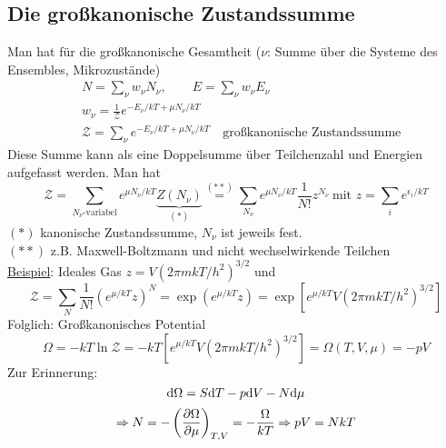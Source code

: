 \subsection{Die großkanonische Zustandssumme}
Man hat für die großkanonische Gesamtheit ($\nu$: Summe über die Systeme des Ensembles, Mikrozustände)
\begin{equation}
    \begin{split}
        & N = \sum_\nu w_\nu N_\nu, \qquad E = \sum_\nu w_\nu E_\nu \\
        & w_\nu = \frac{1}{\mathcal{Z}} e^{- E_\nu / kT + \mu N_\nu / kT} \\
        & \mathcal{Z} = \sum_\nu e^{-E_\nu / k T + \mu N_\nu / kT} \quad \text{großkanonische Zustandssumme}
    \end{split}
\end{equation}
Diese Summe kann als eine Doppelsumme über Teilchenzahl und Energien aufgefasst werden. Man hat
\begin{equation}
    \mathcal{Z} = \sum_{N_\nu \text{-variabel}} e^{\mu N_\nu / k T} \underbrace{Z(N_\nu)}_{(*)} \overset{(**)}{=} \sum_{N_\nu} e^{\mu N_\nu / kT} \frac{1}{N!} z^{N_\nu} \ \text{mit } z = \sum_i e^{\epsilon_i / kT}
\end{equation}
$(*)$ kanonische Zustandssumme, $N_\nu$ ist jeweils fest. \\
$(**)$ z.B. Maxwell-Boltzmann und nicht wechselwirkende Teilchen\\
\underline{Beispiel}: Ideales Gas $z = V (2 \pi m k T / h^2)^{3/2}$ und
\begin{equation}
    \label{eq:grosskan_summe:idealesGas}
    \mathcal{Z} = \sum_N \frac{1}{N!} \left( e^{\mu / kT} z \right)^N = \exp \left( e^{\mu/kT} z \right) = \exp \left[ e^{\mu/kT} V \left( 2 \pi m k T/ h^2 \right)^{3/2} \right]
\end{equation}
Folglich: Großkanonisches Potential
\begin{equation}
    \label{eq:grosskan_pot:idealesGas}
    \Omega = - k T \ln \mathcal{Z} = - k T \left[ e^{\mu/kT} V \left( 2 \pi m k T/ h^2 \right)^{3/2} \right] = \Omega(T, V, \mu) = - p V
\end{equation}
Zur Erinnerung:
\begin{equation}
    \mathrm{d} \Omega = S \mathrm{d} T - p \mathrm{d} V - N \mathrm{d} \mu
\end{equation}
\begin{equation}
    \Rightarrow N = - \left( \frac{\partial \Omega}{\partial \mu} \right)_{T, V} = - \frac{\Omega}{k T} \Rightarrow p V = N k T
\end{equation}
